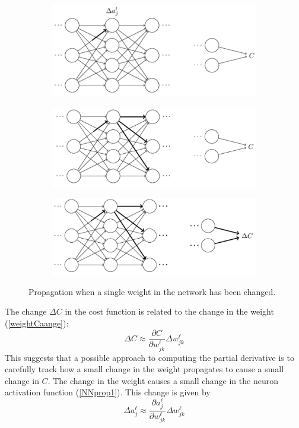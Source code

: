 \documentclass[12pt, letterpaper]{article}
\theoremstyle{definition}
\begin{document}
\begin{figure}
\centering
\begin{subfigure}{0.9\textwidth}
\centering
\includegraphics[width=0.8\linewidth]{img/NNprop1}
\caption{}
\label{NNprop1}
\end{subfigure}
\begin{subfigure}{0.9\textwidth}
\centering
\includegraphics[width=0.8\linewidth]{img/NNprop2}
\caption{}
\label{NNprop2}
\end{subfigure}
\begin{subfigure}{0.9\textwidth}
\centering
\includegraphics[width=0.8\linewidth]{img/NNprop3}
\caption{}
\label{NNprop3}
\end{subfigure}
\caption{Propagation when a single weight in the network has been changed.}
\label{weightCaange}
\end{figure}
The change $\Delta C$ in the cost function is related to the change in the weight (\autoref{weightCaange}):
\begin{equation}
\Delta C \approx \frac{\partial C}{\partial w_{jk}^\ell} \Delta w_{jk}^\ell
\label{DeltaC}
\end{equation}
This suggests that a possible approach to computing the partial derivative is to carefully track how a small change in the weight propagates to cause a small change in $C$. The change in the weight causes a small change in the neuron activation function (\autoref{NNprop1}). This change is given by
\begin{equation}
\Delta a_j^\ell \approx \frac{\partial a_j^\ell}{\partial w_{jk}^\ell}\Delta w_{jk}^\ell
\end{equation}
\end{document}

